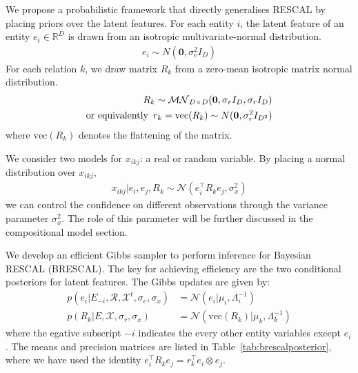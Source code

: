 We propose a probabilistic framework that directly generalises RESCAL
by placing priors over the
latent features. For each entity $i$, the latent feature of an entity $e_i \in
\mathbb{R}^{D}$ is drawn from an isotropic multivariate-normal distribution.
\begin{align}
\label{eqn:entity_gen}
e_i \sim {N}(\mathbf{0}, \sigma_e^2{I}_D)
\end{align}
For each relation $k$, we draw matrix $R_k$ from
a zero-mean isotropic matrix normal distribution.
\begin{align}
\label{eqn:relation_gen}
R_k \sim \mathcal{MN}_{D \times D}(\mathbf{0}, \sigma_r{I}_D, \sigma_r{I}_D) \\
\text{or equivalently}\enspace r_k  = \text{vec}(R_k) \sim N(\mathbf{0}, \sigma_r^2 I_{D^2}) \notag
\end{align}
where $\text{vec}(R_k)$ denotes the flattening of the matrix.

We consider two models for $x_{ikj}$: a real or random variable. By placing a
normal distribution over $x_{ikj}$,
\begin{align}
  x_{ikj} |e_i, e_j, R_k \sim \mathcal{N}(e_i^{\top} R_k e_j, \sigma_x^2) \label{eqn:triple_gen}
\end{align}
we can control the confidence on different observations
through the variance parameter $\sigma_x^2$.
The role of this parameter will be further discussed in the compositional model section.

We develop an efficient Gibbs sampler to perform inference for Bayesian RESCAL (BRESCAL).
The key for achieving efficiency are the two conditional posteriors for latent features.
The Gibbs updates are given by:
\begin{align}
p(e_i |E_{-i}, \mathcal{R}, \mathcal{X}^{t}, \sigma_e, \sigma_x) &= \mathcal{N}(e_i | \mu_i,
\Lambda_i^{-1})  \label{eqn:sample_e} \\
p(R_k|E, \mathcal{X}, \sigma_r, \sigma_x) &= \mathcal{N}(\text{vec}(R_k) |
\mu_k, \Lambda_k^{-1}) \label{eqn:sample_r}
\end{align}
where the egative subscript $-i$ indicates the every other entity variables except $e_i$.
The means and precision matrices are listed in Table~\ref{tab:brescalposterior}, where we have
used the identity $e_i^{\top} R_k e_j = r_k^{\top} e_i \otimes e_j$.

